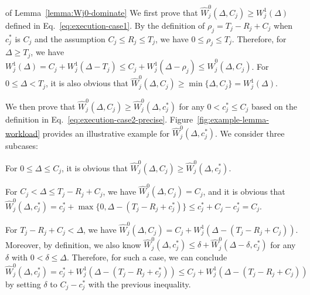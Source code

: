 \begin{appProof}{of Lemma~\ref{lemma:Wj0-dominate}}
  We first prove that $\widehat{W}_j^0(\Delta, C_j) \geq
 W_j^1(\Delta)$ defined in Eq.~\eqref{eq:execution-case1}.  By the definition of $\rho_j=T_j-R_j+C_j$ when $c_j^*$ is $C_j$ and the
 assumption $C_j \leq R_j \leq T_j$, we have $0 \leq \rho_j \leq
 T_j$. Therefore, for $\Delta \geq T_j$, we have $W_j^1(\Delta) = C_j
 + W_j^1(\Delta-T_j) \leq C_j + W_j^1(\Delta - \rho_j) \leq
 \widehat{W}_j^0(\Delta, C_j)$. For $0 \leq \Delta < T_j$, it is also
 obvious that $\widehat{W}_j^0(\Delta, C_j) \geq \min\{\Delta, C_j\}
 = W_j^1(\Delta)$.

 We then prove that $\widehat{W}_j^0(\Delta, C_j) \geq
 \widehat{W}_j^0(\Delta, c_j^*)$ for any $0 < c_j^* \leq C_j$ based on the definition in Eq.~\eqref{eq:execution-case2-precise}. Figure~\ref{fig:example-lemma-workload} provides an illustrative example for $\widehat{W}_j^0(\Delta, c_j^*)$. We consider three subcases:
 \begin{compactitem}
 \item For $0 \leq \Delta \leq C_j$, it is obvious that
   $\widehat{W}_j^0(\Delta, C_j) \geq \widehat{W}_j^0(\Delta,
   c_j^*)$.
 \item For $C_j < \Delta \leq T_j-R_j+C_j$, we have
   $\widehat{W}_j^0(\Delta, C_j) = C_j$, and it is obvious that
   $\widehat{W}_j^0(\Delta, c_j^*) = c_j^* + \max\{0,
   \Delta-(T_j-R_j+c_j^*)\} \leq c_j^* + C_j - c_j^* = C_j$.

 \item For $T_j-R_j+C_j < \Delta$, we have $\widehat{W}_j^0(\Delta,
   C_j) = C_j + W_j^1(\Delta - (T_j-R_j+C_j))$.  Moreover, by
   definition, we also know $\widehat{W}_j^0(\Delta, c_j^*) \leq
   \delta+\widehat{W}_j^0(\Delta-\delta, c_j^*)$ for any $\delta$ with $0 < \delta \leq
   \Delta$. Therefore, for such a case, we can conclude
   $\widehat{W}_j^0(\Delta, c_j^*) = c_j^* + W_j^1(\Delta -
   (T_j-R_j+c_j^*)) \leq C_j + W_j^1(\Delta - (T_j-R_j+C_j))$ by
   setting $\delta$ to $C_j - c_j^*$ with the previous inequality.
 \end{compactitem}
\end{appProof}


